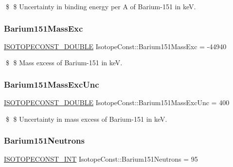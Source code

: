 \$ \$ Uncertainty in binding energy per A of Barium-\/151 in keV. \mbox{\label{group___isotope_const-_barium-_ba151_ga04567afecdbdfddbace74a1be84765c1}} 
\subsubsection{\texorpdfstring{Barium151\+Mass\+Exc}{Barium151MassExc}}
{\footnotesize\ttfamily \mbox{\hyperlink{group___isotope_const-_macros_ga8f45a7272ce02c0b4c65c44636ed719a}{I\+S\+O\+T\+O\+P\+E\+C\+O\+N\+S\+T\+\_\+\+D\+O\+U\+B\+LE}} Isotope\+Const\+::\+Barium151\+Mass\+Exc = -\/44940}

\$ \$ Mass excess of Barium-\/151 in keV. \mbox{\label{group___isotope_const-_barium-_ba151_gac934d37bc7b015af913ec63a40625636}} 
\subsubsection{\texorpdfstring{Barium151\+Mass\+Exc\+Unc}{Barium151MassExcUnc}}
{\footnotesize\ttfamily \mbox{\hyperlink{group___isotope_const-_macros_ga8f45a7272ce02c0b4c65c44636ed719a}{I\+S\+O\+T\+O\+P\+E\+C\+O\+N\+S\+T\+\_\+\+D\+O\+U\+B\+LE}} Isotope\+Const\+::\+Barium151\+Mass\+Exc\+Unc = 400}

\$ \$ Uncertainty in mass excess of Barium-\/151 in keV. \mbox{\label{group___isotope_const-_barium-_ba151_ga46d10ecf4858355f67ca45e9a418351d}} 
\subsubsection{\texorpdfstring{Barium151\+Neutrons}{Barium151Neutrons}}
{\footnotesize\ttfamily \mbox{\hyperlink{group___isotope_const-_macros_ga5f18360b3e99483a35c32d789e62621c}{I\+S\+O\+T\+O\+P\+E\+C\+O\+N\+S\+T\+\_\+\+I\+NT}} Isotope\+Const\+::\+Barium151\+Neutrons = 95}

